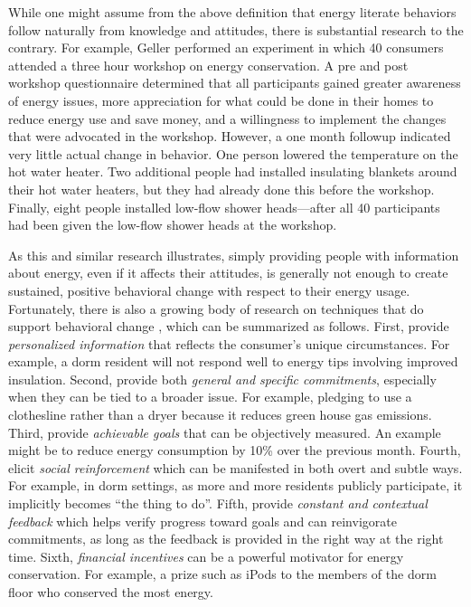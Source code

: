 \documentclass[11pt]{article}
\begin{document}
While one might assume from the above definition that energy literate
behaviors follow naturally from knowledge and attitudes, there is
substantial research to the contrary.  For example, Geller \cite{Geller81}
performed an experiment in which 40 consumers attended a three hour
workshop on energy conservation.  A pre and post workshop questionnaire
determined that all participants gained greater awareness of energy issues,
more appreciation for what could be done in their homes to reduce energy
use and save money, and a willingness to implement the changes that were
advocated in the workshop. However, a one month followup indicated very
little actual change in behavior. One person lowered the temperature on the
hot water heater. Two additional people had installed insulating blankets
around their hot water heaters, but they had already done this before the
workshop. Finally, eight people installed low-flow shower heads---after all
40 participants had been given the low-flow shower heads at the workshop.

As this and similar research illustrates, simply providing people with
information about energy, even if it affects their attitudes, is generally
not enough to create sustained, positive behavioral change with respect to
their energy usage.  Fortunately, there is also a growing body of research
on techniques that do support behavioral change
\cite{Becker78,Darby06,Faruqui09,Houwelingen89,Peterson07,Peterson07a,Staats04,Vollink99},
which can be summarized as follows.  First, provide {\em personalized
  information} that reflects the consumer's unique circumstances.  For
example, a dorm resident will not respond well to energy tips involving
improved insulation.  Second, provide both {\em general and specific
  commitments}, especially when they can be tied to a broader issue. For
example, pledging to use a clothesline rather than a dryer because it
reduces green house gas emissions.  Third, provide {\em achievable goals}
that can be objectively measured.  An example might be to reduce energy
consumption by 10\% over the previous month.  Fourth, elicit {\em social
  reinforcement} which can be manifested in both overt and subtle ways.
For example, in dorm settings, as more and more residents publicly
participate, it implicitly becomes ``the thing to do''.  Fifth, provide
{\em constant and contextual feedback} which helps verify progress toward
goals and can reinvigorate commitments, as long as the feedback is provided
in the right way at the right time.  Sixth, {\em financial incentives} can
be a powerful motivator for energy conservation. For example, a prize such
as iPods to the members of the dorm floor who conserved the most energy.
\end{document}
